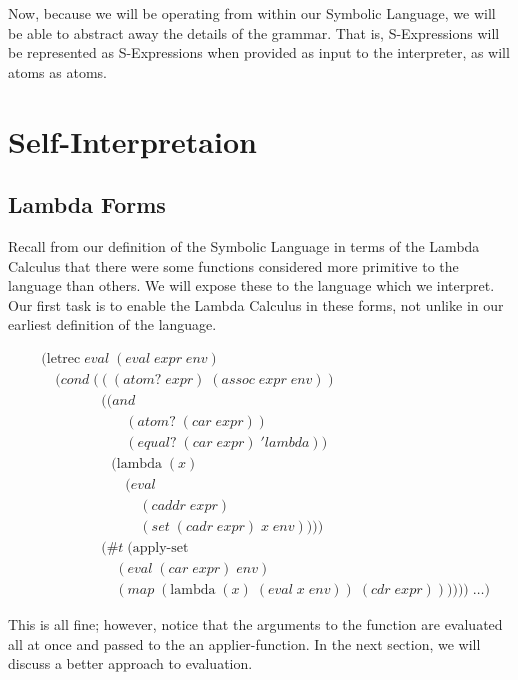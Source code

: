 Now, because we will be operating from within our Symbolic Language, we will 
be able to abstract away the details of the grammar. That is, S-Expressions 
will be represented as S-Expressions when provided as input to the 
interpreter, as will atoms as atoms.

\section{Self-Interpretaion}
\subsection{Lambda Forms}
Recall from our definition of the Symbolic Language in terms of the Lambda 
Calculus that there were some functions considered more primitive to the 
language than others. We will expose these to the language which we 
interpret. Our first task is to enable the Lambda Calculus in these forms, 
not unlike in our earliest definition of the language.

\begin{align*}
& (\text{letrec} \; eval \; (eval \; expr \; env)
\\& \quad (cond \; (((atom? \; expr) \; (assoc \; expr \; env))
\\& \qquad \qquad \; ((and \; 
\\& \qquad \qquad \qquad (atom? \; (car \; expr)) \; 
\\& \qquad \qquad \qquad (equal? \; (car \; expr) \; 'lambda)) \; 
\\& \qquad \qquad \quad (\text{lambda} \; (x) \; 
\\& \qquad \qquad \qquad (eval \; 
\\& \qquad \qquad \qquad \quad (caddr \; expr) \; 
\\& \qquad \qquad \qquad \quad (set \; (cadr \; expr) \; x \; env))))
\\& \qquad \qquad \; (\#t \; (\text{apply-set} \; 
\\& \qquad \qquad \quad \; (eval \; (car \; expr) \; env) \; 
\\& \qquad \qquad \quad \; (map \; (\text{lambda} \; (x) \; (eval \; x \; env)) \; (cdr \; expr)))))) \; \dots)
\end{align*}

This is all fine; however, notice that the arguments to the function are 
evaluated all at once and passed to the an applier-function. In the next 
section, we will discuss a better approach to evaluation.

